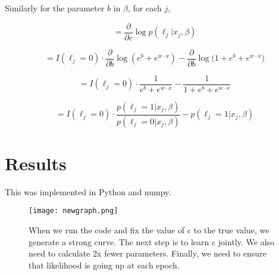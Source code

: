 \documentclass[]{article}
\begin{document}
Similarly for the parameter $b$ in $\beta$, for each $j$,


$$
 = \frac{\partial}{\partial c}\log{p(\ell_j | x_j, \beta)}
$$


$$
 = I(\ell_j=0) \cdot \frac{\partial}{\partial b}
		\log{  \left( e^b + e^{w \cdot x} \right) }
		- \frac{\partial}{\partial b}
		 \log{\bigg(
			1 + e^b + e^{w \cdot x}
		\bigg)}
$$


$$
 = I(\ell_j=0) \cdot
		\frac{1}{e^b + e^{w \cdot x}}
		-
		 \frac{1}{
			1 + e^b + e^{w \cdot x}
		}
$$


$$
 = I(\ell_j=0) \cdot
		\frac{p(\ell_j=1 | x_j,\beta)}{p(\ell_j=0 | x_j,\beta)}
		-
		 p(\ell_j=1 | x_j,\beta)
$$

\section{Results}

This was implemented in Python and numpy.

\label{Reproduce Elkan 2008 graph with generated data}
\begin{figure}[ht!]
\centering
\texttt{[image: newgraph.png]}
\caption{When we run the code and fix the value of c to the true value, we generate a strong curve. The next step is to learn c jointly. We also need to calculate 2x fewer parameters. Finally, we need to ensure that likelihood is going up at each epoch.}
\end{figure}
\end{document}
